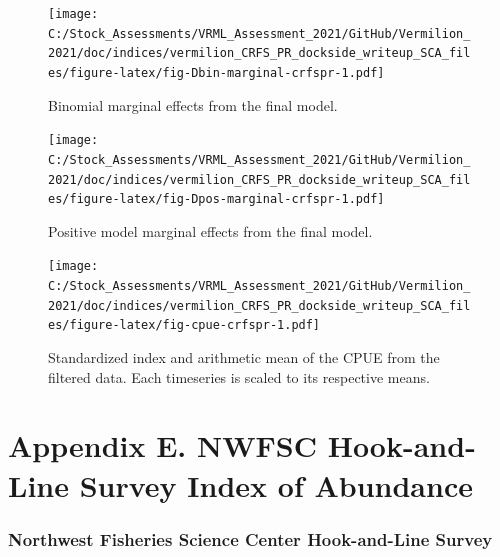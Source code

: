 \documentclass[11pt,
  english,
]{article}
\begin{document}
\begin{figure}
\centering
\texttt{[image: C:/Stock\_Assessments/VRML\_Assessment\_2021/GitHub/Vermilion\_2021/doc/indices/vermilion\_CRFS\_PR\_dockside\_writeup\_SCA\_files/figure-latex/fig-Dbin-marginal-crfspr-1.pdf]}
\caption{\label{fig:fig-Dbin-marginal-crfspr}Binomial marginal effects from the final model.}
\end{figure}

\begin{figure}
\centering
\texttt{[image: C:/Stock\_Assessments/VRML\_Assessment\_2021/GitHub/Vermilion\_2021/doc/indices/vermilion\_CRFS\_PR\_dockside\_writeup\_SCA\_files/figure-latex/fig-Dpos-marginal-crfspr-1.pdf]}
\caption{\label{fig:fig-Dpos-marginal-crfspr}Positive model marginal effects from the final model.}
\end{figure}

\begin{figure}
\centering
\texttt{[image: C:/Stock\_Assessments/VRML\_Assessment\_2021/GitHub/Vermilion\_2021/doc/indices/vermilion\_CRFS\_PR\_dockside\_writeup\_SCA\_files/figure-latex/fig-cpue-crfspr-1.pdf]}
\caption{\label{fig:fig-cpue-crfspr}Standardized index and arithmetic mean of the CPUE from the filtered data. Each timeseries is scaled to its respective means.}
\end{figure}

\clearpage


\hypertarget{appendix-e.-nwfsc-hook-and-line-survey-index-of-abundance}{%
\section*{Appendix E. NWFSC Hook-and-Line Survey Index of Abundance}\label{appendix-e.-nwfsc-hook-and-line-survey-index-of-abundance}}

\leavevmode\tagmcend\tagstructend

\renewcommand{\thepage}{E\arabic{page}}
\renewcommand{\thefigure}{E\arabic{figure}}
\renewcommand{\thetable}{E\arabic{table}}
\setcounter{page}{1}
\setcounter{figure}{0}
\setcounter{table}{0}


\hypertarget{northwest-fisheries-science-center-hook-and-line-survey}{%
\subsubsection{Northwest Fisheries Science Center Hook-and-Line Survey}\label{northwest-fisheries-science-center-hook-and-line-survey}}
\end{document}
